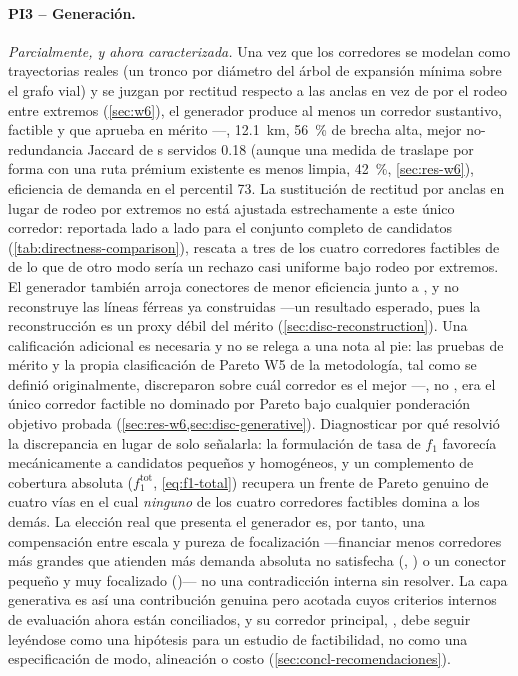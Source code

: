 \paragraph{PI3 -- Generación.} \emph{Parcialmente, y ahora caracterizada.} Una vez que los
corredores se modelan como trayectorias reales (un tronco por diámetro del árbol de
expansión mínima sobre el grafo vial) y se juzgan por rectitud respecto a las anclas en vez
de por el rodeo entre extremos (\cref{sec:w6}), el generador produce al menos un corredor
sustantivo, factible y que aprueba en mérito ---, \SI{12.1}{\kilo\metre},
\SI{56}{\percent} de brecha alta, mejor no-redundancia Jaccard de \ageb{}s servidos
\num{0.18} (aunque una medida de traslape por forma con una ruta prémium existente es
menos limpia, \SI{42}{\percent}, \cref{sec:res-w6}), eficiencia de demanda en el
percentil \num{73}. La sustitución de rectitud por anclas en lugar de rodeo por
extremos no está ajustada estrechamente a este único corredor: reportada lado a lado
para el conjunto completo de candidatos (\cref{tab:directness-comparison}), rescata a
tres de los cuatro corredores factibles de \zmg de lo que de otro modo sería un rechazo
casi uniforme bajo rodeo por extremos. El generador también arroja conectores de menor
eficiencia junto a , y no reconstruye las
líneas férreas ya construidas ---un resultado esperado, pues la reconstrucción es un proxy
débil del mérito (\cref{sec:disc-reconstruction}). Una calificación adicional es
necesaria y no se relega a una nota al pie: las pruebas de mérito y la propia
clasificación de Pareto W5 de la metodología, tal como se definió originalmente,
discreparon sobre cuál corredor es el mejor ---, no , era el
único corredor factible no dominado por Pareto bajo cualquier ponderación objetivo
probada (\cref{sec:res-w6,sec:disc-generative}). Diagnosticar por qué resolvió la
discrepancia en lugar de solo señalarla: la formulación de tasa de $f_1$ favorecía
mecánicamente a candidatos pequeños y homogéneos, y un complemento de cobertura
absoluta ($f_1^{\text{tot}}$, \cref{eq:f1-total}) recupera un frente de Pareto genuino
de cuatro vías en el cual \emph{ninguno} de los cuatro corredores factibles domina a
los demás. La elección real que presenta el generador es, por tanto, una compensación
entre escala y pureza de focalización ---financiar menos corredores más grandes que
atienden más demanda absoluta no satisfecha (, ) o un
conector pequeño y muy focalizado ()--- no una contradicción interna sin
resolver. La capa generativa es así una
contribución genuina pero acotada cuyos criterios internos de evaluación ahora están
conciliados, y su corredor principal, , debe seguir leyéndose como una
hipótesis para un estudio de factibilidad, no como una especificación de modo,
alineación o costo (\cref{sec:concl-recomendaciones}).

